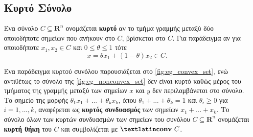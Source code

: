 \subsection{Κυρτό Σύνολο} Ένα σύνολο $C \subseteq \mathbf{R}^n$ ονομάζεται \textbf{κυρτό} αν το τμήμα
γραμμής μεταξύ δύο οποιοδήποτε σημείων που ανήκουν στο $C$, βρίσκεται στο
$C$. Για παράδειγμα αν για οποιοδήποτε $x_1, x_2 \in C$ και
$0 \leq \theta \leq 1$ τότε
\begin{equation*}
    x = \theta x_1 + (1 - \theta) x_2 \in C.
\end{equation*}

Ένα παράδειγμα κυρτού συνόλου παρουσιάζεται στο \ref{fig:eg_convex_set}, ενώ
αντιθέτως το σύνολο της \ref{fig:eg_nonconvex_set} δεν είναι κυρτό καθώς
μέρος του τμήματος της γραμμής μεταξύ των σημείων $x$ και $y$ δεν περιλαμβάνεται
στο σύνολο. Το σημείο της μορφής $\theta_1 x_1 + \dots + \theta_k
x_k$, όπου $\theta_1 + \dots + \theta_k = 1$ και $\theta_i \geq 0$ για $i = 1,
\dots ,k$, αναφέρεται ως \textbf{κυρτός
συνδυασμός} των σημείων $x_1 + \dots + x_k$. Το σύνολο όλων των κυρτών
συνδυασμών των σημείων του συνόλου $C \subseteq \mathbf{R}^n$
ονομάζεται \textbf{κυρτή θήκη} του $C$ και συμβολίζεται με
$\textbf{\tl{conv}} \ C$.

